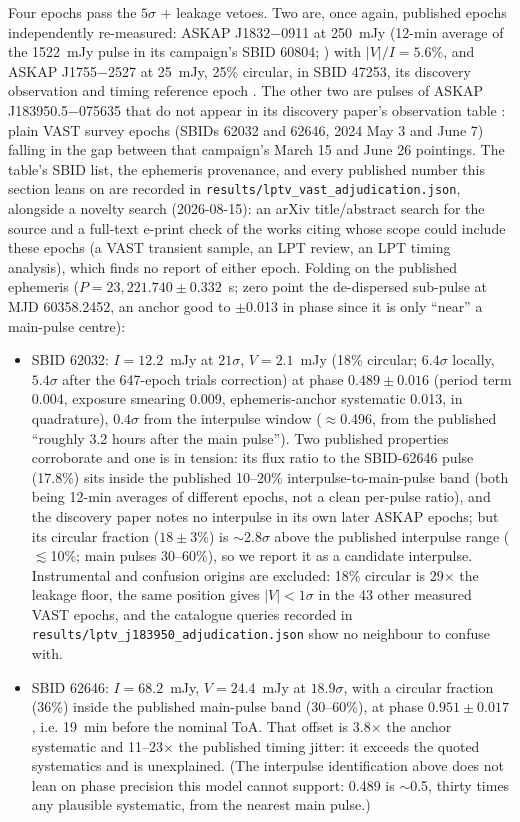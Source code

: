 \documentclass[twocolumn]{aastex631}
\newcommand{\code}[1]{\texttt{#1}}
\begin{document}
Four epochs pass the $5\sigma$ $+$ leakage vetoes. Two are, once again, published epochs
independently re-measured: ASKAP J1832$-$0911 at 250~mJy (12-min average of the 1522~mJy
pulse in its campaign's SBID 60804; \citealt{wang2025}) with $|V|/I = 5.6\%$, and ASKAP
J1755$-$2527 at 25~mJy, 25\% circular, in SBID 47253, its discovery observation and
timing reference epoch \citep{mcsweeney2025}. The other two are pulses of ASKAP
J183950.5$-$075635 that do not appear in its discovery paper's observation table
\citep{lee2025}: plain VAST survey epochs (SBIDs 62032 and 62646, 2024 May 3 and June 7)
falling in the gap between that campaign's March 15 and June 26 pointings. The table's
SBID list, the ephemeris provenance, and every published number this section leans on are
recorded in \code{results/lptv\_vast\_adjudication.json}, alongside a novelty search
(2026-08-15): an arXiv title/abstract search for the source and a full-text e-print
check of the works citing \citet{lee2025} whose scope could include these epochs (a VAST
transient sample, an LPT review, an LPT timing analysis), which finds no report of
either epoch. Folding on the
published ephemeris ($P = 23{,}221.740 \pm 0.332$~s; zero point the de-dispersed sub-pulse
at MJD 60358.2452, an anchor good to $\pm$0.013 in phase since it is only ``near'' a
main-pulse centre):

\begin{itemize}
\item SBID 62032: $I = 12.2$~mJy at $21\sigma$, $V = 2.1$~mJy (18\% circular; $6.4\sigma$
locally, $5.4\sigma$ after the 647-epoch trials correction) at phase $0.489 \pm 0.016$
(period term 0.004, exposure smearing 0.009, ephemeris-anchor systematic 0.013, in
quadrature), $0.4\sigma$ from the interpulse window ($\approx$0.496, from the published
``roughly 3.2 hours after the main pulse''). Two published properties corroborate and one
is in tension: its flux ratio to the SBID-62646 pulse (17.8\%) sits inside the published
10--20\% interpulse-to-main-pulse band (both being 12-min averages of different epochs,
not a clean per-pulse ratio), and the discovery paper notes no interpulse in its own later
ASKAP epochs; but its circular fraction ($18 \pm 3\%$) is $\sim$2.8$\sigma$ above the
published interpulse range ($\lesssim$10\%; main pulses 30--60\%), so we report it as a
candidate interpulse. Instrumental and confusion origins are excluded: 18\%
circular is 29$\times$ the leakage floor, the same position gives $|V| < 1\sigma$ in the
43 other measured VAST epochs, and the catalogue queries recorded in
\code{results/lptv\_j183950\_adjudication.json} show no neighbour to confuse with.
\item SBID 62646: $I = 68.2$~mJy, $V = 24.4$~mJy at $18.9\sigma$, with a circular fraction
(36\%) inside the published main-pulse band (30--60\%), at phase $0.951 \pm 0.017$,
i.e. 19~min before the nominal ToA. That offset is 3.8$\times$ the anchor systematic and
11--23$\times$ the published timing jitter: it exceeds the quoted systematics and is
unexplained. (The interpulse identification above does not lean on phase precision this
model cannot support: 0.489 is $\sim$0.5, thirty times any plausible systematic,
from the nearest main pulse.)
\end{itemize}
\end{document}
